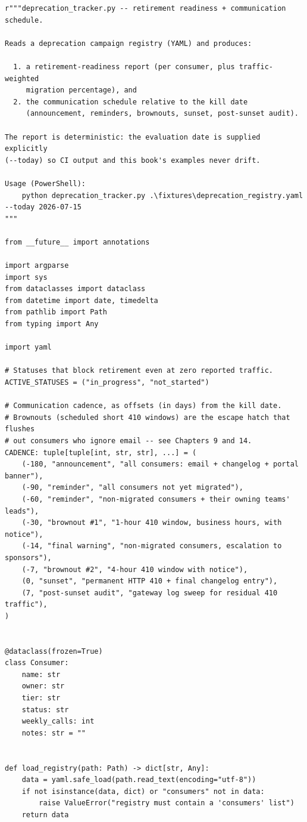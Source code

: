 \begin{verbatim}
r"""deprecation_tracker.py -- retirement readiness + communication schedule.

Reads a deprecation campaign registry (YAML) and produces:

  1. a retirement-readiness report (per consumer, plus traffic-weighted
     migration percentage), and
  2. the communication schedule relative to the kill date
     (announcement, reminders, brownouts, sunset, post-sunset audit).

The report is deterministic: the evaluation date is supplied explicitly
(--today) so CI output and this book's examples never drift.

Usage (PowerShell):
    python deprecation_tracker.py .\fixtures\deprecation_registry.yaml --today 2026-07-15
"""

from __future__ import annotations

import argparse
import sys
from dataclasses import dataclass
from datetime import date, timedelta
from pathlib import Path
from typing import Any

import yaml

# Statuses that block retirement even at zero reported traffic.
ACTIVE_STATUSES = ("in_progress", "not_started")

# Communication cadence, as offsets (in days) from the kill date.
# Brownouts (scheduled short 410 windows) are the escape hatch that flushes
# out consumers who ignore email -- see Chapters 9 and 14.
CADENCE: tuple[tuple[int, str, str], ...] = (
    (-180, "announcement", "all consumers: email + changelog + portal banner"),
    (-90, "reminder", "all consumers not yet migrated"),
    (-60, "reminder", "non-migrated consumers + their owning teams' leads"),
    (-30, "brownout #1", "1-hour 410 window, business hours, with notice"),
    (-14, "final warning", "non-migrated consumers, escalation to sponsors"),
    (-7, "brownout #2", "4-hour 410 window with notice"),
    (0, "sunset", "permanent HTTP 410 + final changelog entry"),
    (7, "post-sunset audit", "gateway log sweep for residual 410 traffic"),
)


@dataclass(frozen=True)
class Consumer:
    name: str
    owner: str
    tier: str
    status: str
    weekly_calls: int
    notes: str = ""


def load_registry(path: Path) -> dict[str, Any]:
    data = yaml.safe_load(path.read_text(encoding="utf-8"))
    if not isinstance(data, dict) or "consumers" not in data:
        raise ValueError("registry must contain a 'consumers' list")
    return data



\end{verbatim}
